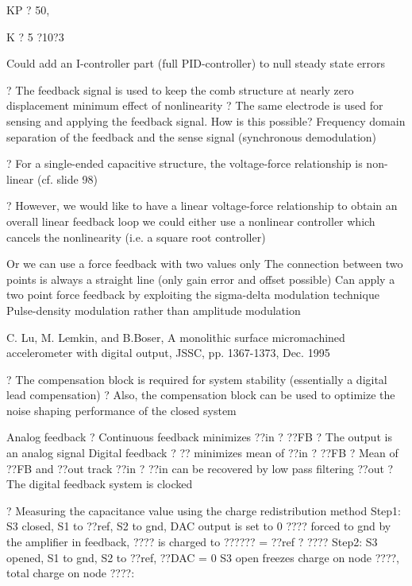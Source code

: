 \documentclass[2pt,landscape]{article}
\begin{document}
\begin{multicols*}{5}
KP ? 50,


K	? 5 ?10?3


\textbullet 	Could add an I-controller part (full PID-controller) to null steady state errors




?	The feedback signal is used to keep the comb structure at nearly zero 
displacement	minimum effect of nonlinearity
?	The same electrode is used for sensing and applying the feedback 
signal. How is this possible?	Frequency domain separation of the 
feedback and the sense signal (synchronous demodulation)



?	For a single-ended capacitive structure, the voltage-force relationship 
is non-linear (cf. slide 98)


?	However, we would like to have a linear voltage-force relationship to 
obtain an overall linear feedback loop
we could either use a nonlinear controller which cancels the 
nonlinearity (i.e. a square root controller)

Or we can use a force feedback with two values only
\textbullet 	The connection between two points is always
a straight line (only gain error and offset possible)
\textbullet 	Can apply a two point force feedback by exploiting 
the sigma-delta modulation technique
\textbullet 	Pulse-density modulation rather than amplitude 
modulation









C. Lu, M. Lemkin, and B.Boser, \textbullet A monolithic surface micromachined accelerometer with digital 
output\textbullet , JSSC, pp. 1367-1373, Dec. 1995



?	The compensation block is required for system stability (essentially a 
digital lead compensation)
?	Also, the compensation block can be used to optimize the noise 
shaping performance of the closed system




Analog feedback
?	Continuous feedback 
minimizes ??in ? ??FB
?	The output is an analog 
signal
Digital feedback
?	?? minimizes mean of
??in ? ??FB
?	Mean of ??FB and ??out
track ??in
?	??in can be recovered by 
low pass filtering ??out
?	The digital feedback 
system is clocked



?	Measuring the capacitance value using the charge redistribution method
\textbullet 	Step1: S3 closed, S1 to ??ref, S2 to gnd, DAC output is set to 0
????  forced to gnd by the amplifier in feedback, ????  is charged to ??????  = ??ref  ? ????
\textbullet 	Step2: S3 opened, S1 to gnd, S2 to ??ref, ??DAC = 0
S3 open freezes charge on node ????, total charge on node ????:



\end{multicols*}
\end{document}
